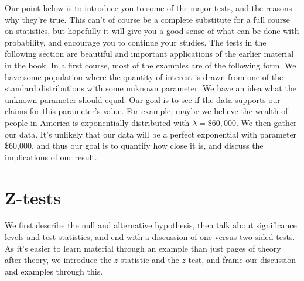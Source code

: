 Our point below is to introduce you to some of the major tests, and the reasons why they're true. This can't of course be a complete substitute for a full course on statistics, but hopefully it will give you a good sense of what can be done with probability, and encourage you to continue your studies. The tests in the following section are beautiful and important applications of the earlier material in the book. In a first course, most of the examples are of the following form. We have some population where the quantity of interest is drawn from one of the standard distributions with some unknown parameter. We have an idea what the unknown parameter should equal. Our goal is to see if the data supports our claims for this parameter's value. For example, maybe we believe the wealth of people in America is exponentially distributed with $\lambda = \$60,000$. We then gather our data. It's unlikely that our data will be a perfect exponential with parameter \$60,000, and thus our goal is to quantify how close it is, and discuss the implications of our result.




\section{Z-tests} \label{sec:Z-tests}









We first describe the null and alternative hypothesis, then talk about significance levels and test statistics, and end with a discussion of one versus two-sided tests. As it's easier to learn material through an example than just pages of theory after theory, we introduce the $z$-statistic and the $z$-test, and frame our discussion and examples through this.








